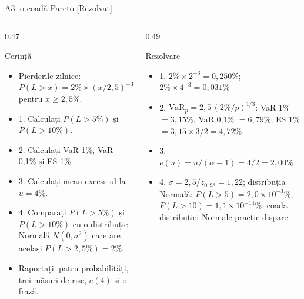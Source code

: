 \begin{frame}{A3: o coadă Pareto [Rezolvat]}
\itemsize{\scriptsize}
\begin{columns}[T]
\begin{column}{0.47\textwidth}
\begin{block}{Cerință}
\begin{itemize}
    \item Pierderile zilnice: $P(L > x) = 2\% \times (x/2{,}5)^{-3}$ pentru $x \ge 2{,}5\%$.
    \item 1. Calculați $P(L > 5\%)$ și $P(L > 10\%)$.
    \item 2. Calculați VaR 1\%, VaR 0,1\% și ES 1\%.
    \item 3. Calculați mean excess-ul la $u = 4\%$.
    \item 4. Comparați $P(L > 5\%)$ și $P(L > 10\%)$ cu o distribuție Normală $N(0, \sigma^2)$ care are același $P(L > 2{,}5\%) = 2\%$.
    \item Raportați: patru probabilități, trei măsuri de risc, $e(4)$ și o frază.
\end{itemize}
\end{block}
\end{column}
\begin{column}{0.49\textwidth}
\begin{exampleblock}{Rezolvare}
\begin{itemize}
    \item 1. $2\% \times 2^{-3} = 0{,}250\%$; $2\% \times 4^{-3} = 0{,}031\%$
    \item 2. $\mathrm{VaR}_p = 2{,}5\,(2\%/p)^{1/3}$: VaR 1\% $= 3{,}15\%$, VaR 0,1\% $= 6{,}79\%$; ES 1\% $= 3{,}15 \times 3/2 = 4{,}72\%$
    \item 3. $e(u) = u/(\alpha - 1) = 4/2 = 2{,}00\%$
    \item 4. $\sigma = 2{,}5/z_{0{,}98} = 1{,}22$; distribuția Normală: $P(L > 5) = 2{,}0\times 10^{-3}\%$, $P(L > 10) = 1{,}1\times 10^{-14}\%$: coada distribuției Normale practic dispare
\end{itemize}
\end{exampleblock}
\end{column}
\end{columns}
\end{frame}

